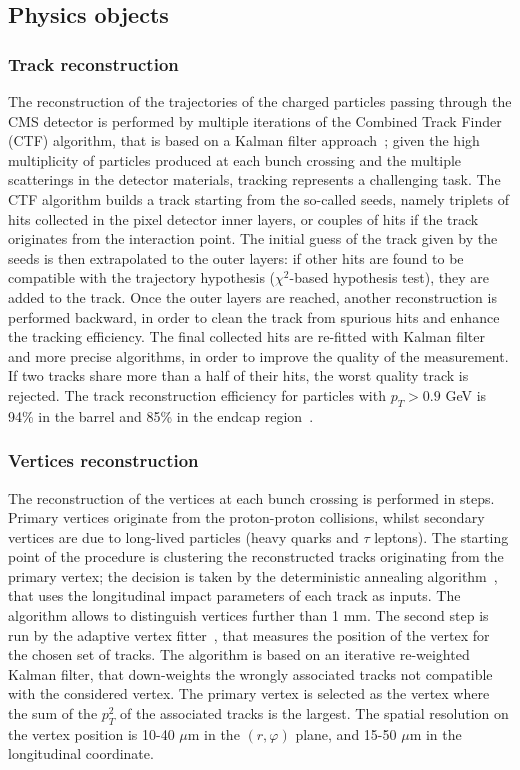 \subsection{Physics objects}
\label{ssec:physicsobjects}

\subsubsection{Track reconstruction}
The reconstruction of the trajectories of the charged particles passing through the CMS detector is performed by multiple iterations of the Combined Track Finder (CTF) algorithm, that is based on a Kalman filter approach~\cite{Fruhwirth:1987fm}; given the high multiplicity of particles produced at each bunch crossing and the multiple scatterings in the detector materials, tracking represents a challenging task. The CTF algorithm builds a track starting from the so-called seeds, namely triplets of hits collected in the pixel detector inner layers, or couples of hits if the track originates from the interaction point. The initial guess of the track given by the seeds is then extrapolated to the outer layers: if other hits are found to be compatible with the trajectory hypothesis ($\chi^2$-based hypothesis test), they are added to the track. Once the outer layers are reached, another reconstruction is performed backward, in order to clean the track from spurious hits and enhance the tracking efficiency. The final collected hits are re-fitted with Kalman filter and more precise algorithms, in order to improve the quality of the measurement. If two tracks share more than a half of their hits, the worst quality track is rejected. The track reconstruction efficiency for particles with $p_T >0.9$ GeV is 94\% in the barrel and 85\% in the endcap region~\cite{Chatrchyan:2014fea}.\\


\subsubsection{Vertices reconstruction}
The reconstruction of the vertices at each bunch crossing is performed in steps. Primary vertices originate from the proton-proton collisions, whilst secondary vertices are due to long-lived particles (heavy quarks and $\tau$ leptons). The starting point of the procedure is clustering the reconstructed tracks originating from the primary vertex; the decision is taken by the deterministic annealing algorithm~\cite{bib:detanneal}, that uses the longitudinal impact parameters of each track as inputs. The algorithm allows to distinguish vertices further than 1 mm. The second step is run by the adaptive vertex fitter~\cite{Fruhwirth:2007hz}, that measures the position of the vertex for the chosen set of tracks. The algorithm is based on an iterative re-weighted Kalman filter, that down-weights the wrongly associated tracks not compatible with the considered vertex. The primary vertex is selected as the vertex where the sum of the $p_T^2$ of the associated tracks is the largest. The spatial resolution on the vertex position is 10-40 $\mu$m in the $(r, \varphi)$ plane, and 15-50 $\mu$m in the longitudinal coordinate.


